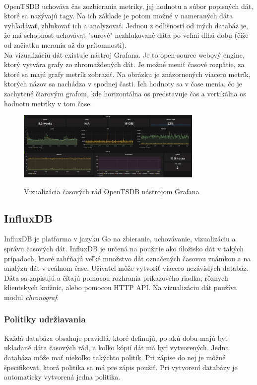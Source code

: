 \documentclass[printed,11pt,twoside,color,cover,table]{fithesis3}
\begin{document}
\\OpenTSDB uchováva čas zozbierania metriky, jej hodnotu a súbor popisných dát, ktoré sa nazývajú tagy. Na ich základe je potom možné
v nameraných dáta vyhľadávať, zhlukovať ich a analyzovať. Jednou z odlišností od iných databáz je, že má schopnosť uchovávať "surové" nezhlukované dáta po veľmi dlhú dobu (čiže od začiatku merania až 
do prítomnosti).
\\Na vizualizáciu dát existuje nástroj Grafana\cite{grafana}. Je to open-source webový engine, ktorý vytvára grafy zo zhromaždených dát. Je možné meniť časové rozpätie, za ktoré sa majú grafy metrík zobraziť.
Na obrázku je znázornených viacero metrík, ktorých názov sa nachádza v spodnej časti. Ich hodnoty sa v čase menia, čo je zachytené čiarovým grafom, kde horizontálna os predstavuje čas a vertikálna os hodnotu
metriky v tom čase.
\begin{figure}[h]
\begin{center}
       \includegraphics[width=0.8\textwidth]{images/grafana.png}
       \caption{Vizualizácia časových rád OpenTSDB nástrojom Grafana}\cite{grafana_pic}
\end{center}
\end{figure}

\subsection{InfluxDB}
InfluxDB je platforma v jazyku Go na zbieranie, uchovávanie, vizualizáciu a správu časových dát. InfluxDB je určená na použitie ako úložisko dát v takých prípadoch, ktoré zahŕňajú veľké množstvo
dát označených časovou známkou a na analýzu dát v reálnom čase.\cite{influxdb}
 Užívateľ môže vytvoriť viacero nezávislých databáz. 
Dáta sa zapisujú a čítajú pomocou rozhrania príkazového riadka, rôznych klientskych knižníc, alebo pomocou HTTP API. 
Na vizualizáciu dát používa modul \emph{chronograf}.

\subsubsection{Politiky udržiavania}
Každá databáza obsahuje pravidlá, ktoré definujú, po akú dobu majú byť ukladané dáta časových rád, a koľko kópií dát má byť vytvorených. Jedna databáza môže mať niekoľko takýchto politík. Pri zápise 
do nej je môžné špecifikovať, ktorá politika sa má pre zápis použiť. Pri vytvorení databázy je automaticky vytvorená jedna politika.
\end{document}
